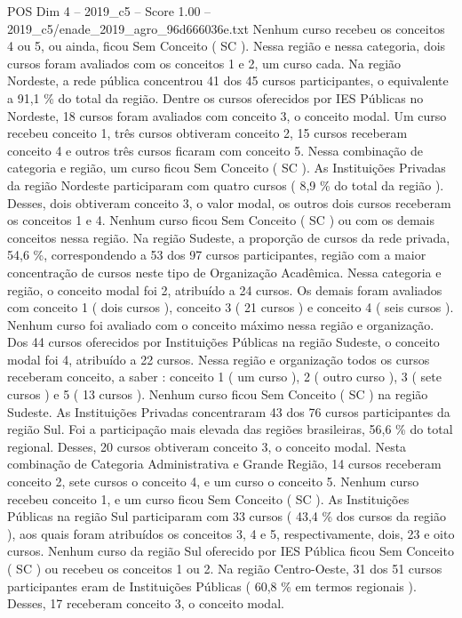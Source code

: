 \begin{textsample}{POS Dim 4 – 2019\_c5 – Score 1.00 – 2019\_c5/enade\_2019\_agro\_96d666036e.txt}
Nenhum curso recebeu os conceitos 4 ou 5, ou ainda, ficou Sem Conceito ( SC ).
Nessa região e nessa categoria, dois cursos foram avaliados com os conceitos 1 e 2, um curso cada.
Na região Nordeste, a rede pública concentrou 41 dos 45 cursos participantes, o equivalente a 91,1 \% do total da região.
Dentre os cursos oferecidos por IES Públicas no Nordeste, 18 cursos foram avaliados com conceito 3, o conceito modal.
Um curso recebeu conceito 1, três cursos obtiveram conceito 2, 15 cursos receberam conceito 4 e outros três cursos ficaram com conceito 5.
Nessa combinação de categoria e região, um curso ficou Sem Conceito ( SC ).
As Instituições Privadas da região Nordeste participaram com quatro cursos ( 8,9 \% do total da região ).
Desses, dois obtiveram conceito 3, o valor modal, os outros dois cursos receberam os conceitos 1 e 4.
Nenhum curso ficou Sem Conceito ( SC ) ou com os demais conceitos nessa região.
Na região Sudeste, a proporção de cursos da rede privada, 54,6 \%, correspondendo a 53 dos 97 cursos participantes, região com a maior concentração de cursos neste tipo de Organização Acadêmica.
Nessa categoria e região, o conceito modal foi 2, atribuído a 24 cursos.
Os demais foram avaliados com conceito 1 ( dois cursos ), conceito 3 ( 21 cursos ) e conceito 4 ( seis cursos ).
Nenhum curso foi avaliado com o conceito máximo nessa região e organização.
Dos 44 cursos oferecidos por Instituições Públicas na região Sudeste, o conceito modal foi 4, atribuído a 22 cursos.
Nessa região e organização todos os cursos receberam conceito, a saber : conceito 1 ( um curso ), 2 ( outro curso ), 3 ( sete cursos ) e 5 ( 13 cursos ).
Nenhum curso ficou Sem Conceito ( SC ) na região Sudeste.
As Instituições Privadas concentraram 43 dos 76 cursos participantes da região Sul.
Foi a participação mais elevada das regiões brasileiras, 56,6 \% do total regional.
Desses, 20 cursos obtiveram conceito 3, o conceito modal.
Nesta combinação de Categoria Administrativa e Grande Região, 14 cursos receberam conceito 2, sete cursos o conceito 4, e um curso o conceito 5.
Nenhum curso recebeu conceito 1, e um curso ficou Sem Conceito ( SC ).
As Instituições Públicas na região Sul participaram com 33 cursos ( 43,4 \% dos cursos da região ), aos quais foram atribuídos os conceitos 3, 4 e 5, respectivamente, dois, 23 e oito cursos.
Nenhum curso da região Sul oferecido por IES Pública ficou Sem Conceito ( SC ) ou recebeu os conceitos 1 ou 2.
Na região Centro-Oeste, 31 dos 51 cursos participantes eram de Instituições Públicas ( 60,8 \% em termos regionais ).
Desses, 17 receberam conceito 3, o conceito modal.

\end{textsample}
